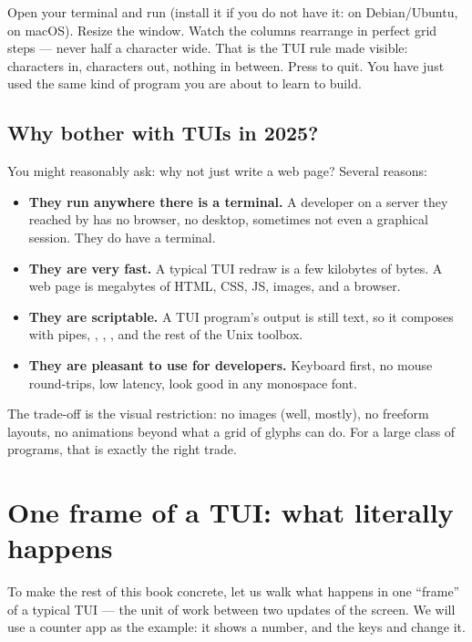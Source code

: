 \begin{tryit}
Open your terminal and run  (install it if you do not have
it:  on Debian/Ubuntu,  on macOS). Resize the window. Watch the columns rearrange in
perfect grid steps --- never half a character wide. That is the TUI
rule made visible: characters in, characters out, nothing in between.
Press  to quit. You have just used the same kind of program
you are about to learn to build.
\end{tryit}

\subsection{Why bother with TUIs in 2025?}

You might reasonably ask: why not just write a web page? Several
reasons:

\begin{itemize}[leftmargin=*]
  \item \textbf{They run anywhere there is a terminal.} A developer
    on a server they reached by  has no browser, no
    desktop, sometimes not even a graphical session. They do have a
    terminal.
  \item \textbf{They are very fast.} A typical TUI redraw is a few
    kilobytes of bytes. A web page is megabytes of HTML, CSS, JS,
    images, and a browser.
  \item \textbf{They are scriptable.} A TUI program's output is
    still text, so it composes with pipes, , ,
    , and the rest of the Unix toolbox.
  \item \textbf{They are pleasant to use for developers.} Keyboard
    first, no mouse round-trips, low latency, look good in any
    monospace font.
\end{itemize}

The trade-off is the visual restriction: no images (well, mostly), no
freeform layouts, no animations beyond what a grid of glyphs can do.
For a large class of programs, that is exactly the right trade.

\section{One frame of a TUI: what literally happens}
\label{sec:intro:one-frame}

To make the rest of this book concrete, let us walk what happens in
one ``frame'' of a typical TUI --- the unit of work between two
updates of the screen. We will use a counter app as the example: it
shows a number, and the keys \code{+} and \code{-} change it.

